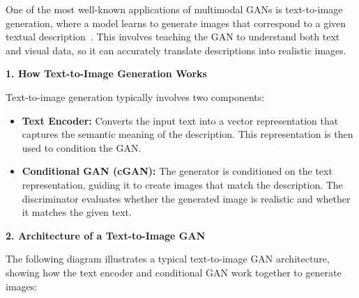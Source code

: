 One of the most well-known applications of multimodal GANs is text-to-image generation, where a model learns to generate images that correspond to a given textual description~\cite{patashnik2021styleclip}. This involves teaching the GAN to understand both text and visual data, so it can accurately translate descriptions into realistic images.

\textbf{1. How Text-to-Image Generation Works}

Text-to-image generation typically involves two components:
\begin{itemize}
    \item \textbf{Text Encoder:} Converts the input text into a vector representation that captures the semantic meaning of the description. This representation is then used to condition the GAN.
    \item \textbf{Conditional GAN (cGAN):} The generator is conditioned on the text representation, guiding it to create images that match the description. The discriminator evaluates whether the generated image is realistic and whether it matches the given text.
\end{itemize}

\textbf{2. Architecture of a Text-to-Image GAN}

The following diagram illustrates a typical text-to-image GAN architecture, showing how the text encoder and conditional GAN work together to generate images:

\begin{center}
\end{center} 

